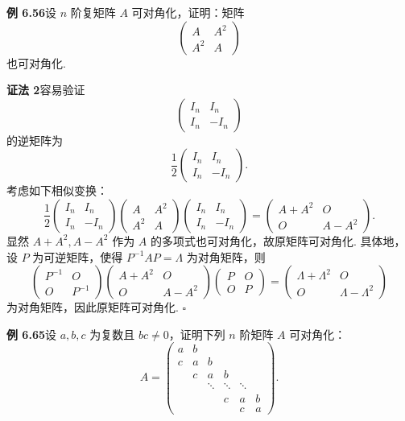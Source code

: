 \documentclass[UTF8,12pt,a4paper,fontset=fandol]{ctexart}
\begin{document}
\noindent\textbf{例 6.56}\quad 设 $n$ 阶复矩阵 $A$ 可对角化，证明：矩阵
\[
\left(\begin{array}{cc}
A & A^2\\
A^2 & A
\end{array}\right)
\]
也可对角化.

\noindent\textbf{证法 2}\quad 容易验证
\[
\left(\begin{array}{cc}
I_n & I_n\\
I_n & -I_n
\end{array}\right)
\]
的逆矩阵为
\[
\frac{1}{2}\left(\begin{array}{cc}
I_n & I_n\\
I_n & -I_n
\end{array}\right).
\]
考虑如下相似变换：
\[
\frac{1}{2}\left(\begin{array}{cc}
I_n & I_n\\
I_n & -I_n
\end{array}\right)
\left(\begin{array}{cc}
A & A^2\\
A^2 & A
\end{array}\right)
\left(\begin{array}{cc}
I_n & I_n\\
I_n & -I_n
\end{array}\right)
=\left(\begin{array}{cc}
A+A^2 & O\\
O & A-A^2
\end{array}\right).
\]
显然 $A+A^2,A-A^2$ 作为 $A$ 的多项式也可对角化，故原矩阵可对角化. 具体地，设 $P$ 为可逆矩阵，使得 $P^{-1}AP=\Lambda$ 为对角矩阵，则
\[
\left(\begin{array}{cc}
P^{-1} & O\\
O & P^{-1}
\end{array}\right)
\left(\begin{array}{cc}
A+A^2 & O\\
O & A-A^2
\end{array}\right)
\left(\begin{array}{cc}
P & O\\
O & P
\end{array}\right)
=\left(\begin{array}{cc}
\Lambda+\Lambda^2 & O\\
O & \Lambda-\Lambda^2
\end{array}\right)
\]
为对角矩阵，因此原矩阵可对角化. $\square$

\noindent\textbf{例 6.65}\quad 设 $a,b,c$ 为复数且 $bc\ne 0$，证明下列 $n$ 阶矩阵 $A$ 可对角化：
\[
A=\left(\begin{array}{cccccc}
a & b & & & &\\
c & a & b & & &\\
& c & a & b & &\\
& & \ddots & \ddots & \ddots &\\
& & & c & a & b\\
& & & & c & a
\end{array}\right).
\]
\end{document}
